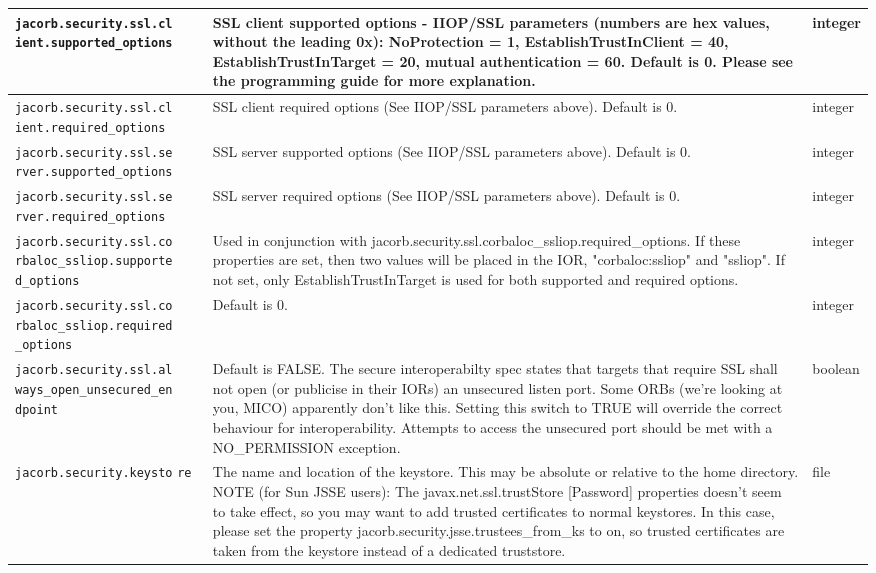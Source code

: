 {{\begin{small}
\begin{longtable}{|p{5cm}|p{9cm}|p{2cm}|}
\hline
\verb"jacorb.security.ssl.cl"
\verb"ient.supported_options" & SSL client supported options - IIOP/SSL parameters (numbers are hex values, without the leading 0x): NoProtection = 1, EstablishTrustInClient = 40, EstablishTrustInTarget = 20, mutual authentication = 60. Default is 0. Please see the programming guide for more explanation. & integer \\
\hline
\verb"jacorb.security.ssl.cl"
\verb"ient.required_options" & SSL client required options (See IIOP/SSL parameters above). Default is 0. & integer \\
\hline
\verb"jacorb.security.ssl.se"
\verb"rver.supported_options" & SSL server supported options (See IIOP/SSL parameters above). Default is 0. & integer \\
\hline
\verb"jacorb.security.ssl.se"
\verb"rver.required_options" & SSL server required options (See IIOP/SSL parameters above). Default is 0. & integer \\
\hline
\verb"jacorb.security.ssl.co"
\verb"rbaloc_ssliop.supporte"
\verb"d_options" & Used in conjunction with jacorb.security.ssl.corbaloc\_ssliop.required\_options. If these properties are set, then two values will be placed in the IOR, "corbaloc:ssliop" and "ssliop". If not set, only EstablishTrustInTarget is used for both supported and required options. & integer \\
\hline
\verb"jacorb.security.ssl.co"
\verb"rbaloc_ssliop.required"
\verb"_options" &  Default is 0. & integer \\
\hline
\verb"jacorb.security.ssl.al"
\verb"ways_open_unsecured_en"
\verb"dpoint" &  Default is FALSE. The secure interoperabilty spec states that targets that require SSL shall not open (or publicise in their IORs) an unsecured listen port. Some ORBs (we're looking at you, MICO) apparently don't like this. Setting this switch to TRUE will override the correct behaviour for interoperability. Attempts to access the unsecured port should be met with a NO\_PERMISSION exception. & boolean \\
\hline
\verb"jacorb.security.keysto"
\verb"re" & The name and location of the keystore. This may be absolute or relative to the home directory. NOTE (for Sun JSSE users): The javax.net.ssl.trustStore [Password] properties doesn't seem to take effect, so you may want to add trusted certificates to normal keystores. In this case, please set the property jacorb.security.jsse.trustees\_from\_ks to on, so trusted certificates are taken from the keystore instead of a dedicated truststore.  & file \\

\end{longtable}
\end{small}}}
